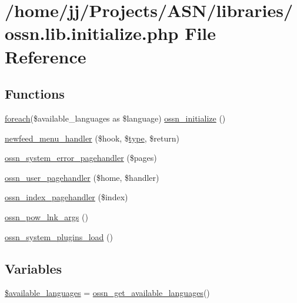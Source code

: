\hypertarget{ossn_8lib_8initialize_8php}{}\section{/home/jj/\+Projects/\+A\+S\+N/libraries/ossn.lib.\+initialize.\+php File Reference}
\label{ossn_8lib_8initialize_8php}
\subsection*{Functions}
\begin{DoxyCompactItemize}
\item 
\hyperlink{user__timeline_8php_a1b18c909b5f0affc85267f294d947c4b}{foreach}(\$available\+\_\+languages as \$language) \hyperlink{ossn_8lib_8initialize_8php_a43234a736acd32cf477a4570182c0aab}{ossn\+\_\+initialize} ()
\item 
\hyperlink{ossn_8lib_8initialize_8php_a6538a52228e25b60943c5e678be8374d}{newfeed\+\_\+menu\+\_\+handler} (\$hook, \$\hyperlink{_ossn_wall_2actions_2wall_2post_2group_8php_a2dc1bb4e1ed0029daa81ac0776b14b51}{type}, \$return)
\item 
\hyperlink{ossn_8lib_8initialize_8php_ad4a069f16229b894a799da3444554552}{ossn\+\_\+system\+\_\+error\+\_\+pagehandler} (\$pages)
\item 
\hyperlink{ossn_8lib_8initialize_8php_afd7ce2207f286bfb5a151c1b5212b508}{ossn\+\_\+user\+\_\+pagehandler} (\$home, \$handler)
\item 
\hyperlink{ossn_8lib_8initialize_8php_ad2663d432a5530e51df00aec7b195bef}{ossn\+\_\+index\+\_\+pagehandler} (\$index)
\item 
\hyperlink{ossn_8lib_8initialize_8php_a5c1d6389d5ef2d2efa7cdfe0d51580a9}{ossn\+\_\+pow\+\_\+lnk\+\_\+args} ()
\item 
\hyperlink{ossn_8lib_8initialize_8php_a389eb1f6c181523a851f58f7211da866}{ossn\+\_\+system\+\_\+plugins\+\_\+load} ()
\end{DoxyCompactItemize}
\subsection*{Variables}
\begin{DoxyCompactItemize}
\item 
\hyperlink{ossn_8lib_8initialize_8php_acfd919cfddfa9d0455035bf186b96050}{\$available\+\_\+languages} = \hyperlink{ossn_8lib_8languages_8php_aacfdf2defbdd672a72a05af06772d97b}{ossn\+\_\+get\+\_\+available\+\_\+languages}()
\end{DoxyCompactItemize}


